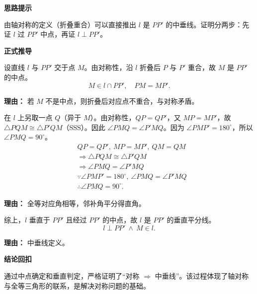 \begin{proofbox}
	\textbf{\textcolor{CProof}{思路提示}}

	由轴对称的定义（折叠重合）可以直接推出 $l$ 是 $PP'$ 的中垂线。证明分两步：先证 $l$ 过 $PP'$ 中点，再证 $l \perp PP'$。

	\medskip
	\textbf{\textcolor{CProof}{正式推导}}
	\begin{description}[style=nextline, leftmargin=2.8em, labelsep=0.5em, itemsep=0.55em]
		\item[\textbf{步骤一（证中点关系）}] 设直线 $l$ 与 $PP'$ 交于点 $M$。由对称性，沿 $l$ 折叠后 $P$ 与 $P'$ 重合，故 $M$ 是 $PP'$ 的中点。
			\[
				M \in l \cap PP',\quad PM = MP'.
			\]
			\par\textbf{理由：} 若 $M$ 不是中点，则折叠后对应点不重合，与对称矛盾。

		\item[\textbf{步骤二（证垂直关系）}] 在 $l$ 上另取一点 $Q$（异于 $M$）。由对称性，$QP = QP'$，又 $MP = MP'$，故 $\triangle PQM \cong \triangle P'QM$（SSS）。因此 $\angle PMQ = \angle P'MQ$。因为 $\angle PMP' = 180^\circ$，所以 $\angle PMQ = 90^\circ$。
			\[
				\begin{aligned}
					&QP=QP',\ MP=MP',\ QM=QM \\
					&\Rightarrow \triangle PQM \cong \triangle P'QM \\
					&\Rightarrow \angle PMQ = \angle P'MQ \\
					&\because \angle PMP'=180^\circ,\ \angle PMQ=\angle P'MQ \\
					&\therefore \angle PMQ=90^\circ.
			\end{aligned}
			\]
			\par\textbf{理由：} 全等对应角相等，邻补角平分得直角。

		\item[\textbf{步骤三（汇总）}] 综上，$l$ 垂直于 $PP'$ 且经过 $PP'$ 的中点，故 $l$ 是 $PP'$ 的垂直平分线。
			\[
				l \perp PP' \ \land\ M \in l.
			\]
			\par\textbf{理由：} 中垂线定义。
	\end{description}

	\medskip
	\textbf{\textcolor{CProof}{结论回扣}}

	通过中点确定和垂直判定，严格证明了“对称 $\Rightarrow$ 中垂线”。该过程体现了轴对称与全等三角形的联系，是解决对称问题的基础。
\end{proofbox}
